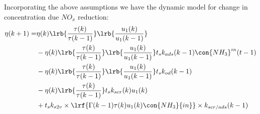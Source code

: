Incorporating the above assumptions we have the dynamic model for change in concentration due $NO_x$ reduction:
\begin{align*}
         \eta(k+1) =& \eta(k) \lrb{\frac{\tau(k)}{\tau(k-1)}}
                                \lrb{\frac{u_1(k)}{u_1(k-1)}}
                \\
                &-\eta(k) \lrb{\frac{\tau(k)}{\tau(k-1)}}
                                \lrb{\frac{u_1(k)}{u_1(k-1)}}
                t_s k_{ads}(k-1) \con{NH_3}^{in}(t-1)
                \\
                &-\eta(k) \lrb{\frac{\tau(k)}{\tau(k-1)}}
                                \lrb{\frac{u_1(k)}{u_1(k-1)}}
                t_s k_{od}(k-1)
                \\
                &-\eta(k) \lrb{\frac{\tau(k)}{\tau(k-1)}}
                t_s k_{scr}(k) u_1(k)
                \\
                &+ t_s k_{s2v} \times \lrf{\Gamma(k-1) \tau(k) u_1(k)\con{NH_3}{in}} \times k_{scr/ads}(k-1)
\end{align*}
\begin{equation}
       \label{eqn::nox_govern}
\end{equation}
